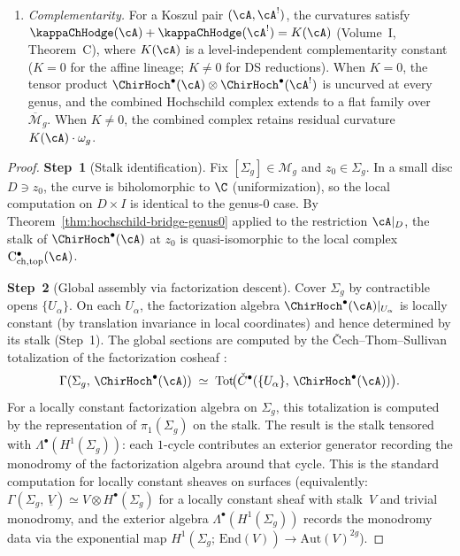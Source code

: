 \begin{theorem}
\begin{enumerate}[label=\textup{(\roman*)}]
\item \emph{Complementarity.}
 For a Koszul pair $(\cA, \cA^!)$, the curvatures satisfy
 $\kappaChHodge(\cA) + \kappaChHodge(\cA^!) = K(\cA)$
 (Volume~I, Theorem~C), where $K(\cA)$ is a level-independent
 complementarity constant ($K = 0$ for the affine lineage;
 $K \neq 0$ for DS reductions). When $K = 0$, the tensor product
 $\ChirHoch^\bullet(\cA) \otimes \ChirHoch^\bullet(\cA^!)$
 is uncurved at every genus, and the combined Hochschild
 complex extends to a flat family over
 $\overline{\mathcal{M}}_g$. When $K \neq 0$, the combined
 complex retains residual curvature $K(\cA) \cdot \omega_g$.
\end{enumerate}
\end{theorem}

\begin{proof}
\textbf{Step~1} (Stalk identification).
Fix $[\Sigma_g] \in \mathcal{M}_g$ and $z_0 \in \Sigma_g$.
In a small disc $D \ni z_0$, the curve is biholomorphic to
$\C$ (uniformization), so the local computation on $D \times I$
is identical to the genus-$0$ case. By
Theorem~\ref{thm:hochschild-bridge-genus0} applied to the
restriction $\cA|_D$, the stalk of $\ChirHoch^\bullet(\cA)$ at
$z_0$ is quasi-isomorphic to the local complex
$\mathrm{C}^\bullet_{\mathrm{ch,top}}(\cA)$.

\textbf{Step~2} (Global assembly via factorization descent).
Cover $\Sigma_g$ by contractible opens $\{U_\alpha\}$. On each
$U_\alpha$, the factorization algebra
$\ChirHoch^\bullet(\cA)|_{U_\alpha}$ is locally constant
(by translation invariance in local coordinates) and hence
determined by its stalk (Step~1). The global sections are
computed by the \v{C}ech--Thom--Sullivan totalization of the
factorization cosheaf
\cite[Chapter~6]{CG17}:
\begin{equation}\label{eq:cech-ts}
\Gamma(\Sigma_g,\, \ChirHoch^\bullet(\cA))
\;\simeq\;
\mathrm{Tot}\!\bigl(
 \check{C}^\bullet(\{U_\alpha\},\,
 \ChirHoch^\bullet(\cA))
\bigr).
\end{equation}
For a locally constant factorization algebra on $\Sigma_g$,
this totalization is computed by the representation of
$\pi_1(\Sigma_g)$ on the stalk. The result is the stalk
tensored with $\Lambda^\bullet(H^1(\Sigma_g))$: each
$1$-cycle contributes an exterior generator recording the
monodromy of the factorization algebra around that cycle.
This is the standard computation for locally constant sheaves
on surfaces (equivalently: $\Gamma(\Sigma_g,\,
\underline{V}) \simeq V \otimes
H^\bullet(\Sigma_g)$ for a locally constant sheaf with
stalk~$V$ and trivial monodromy, and the exterior algebra
$\Lambda^\bullet(H^1(\Sigma_g))$ records the monodromy
data via the exponential map
$H^1(\Sigma_g;\, \mathrm{End}(V)) \to
\mathrm{Aut}(V)^{2g}$).


\end{proof}
